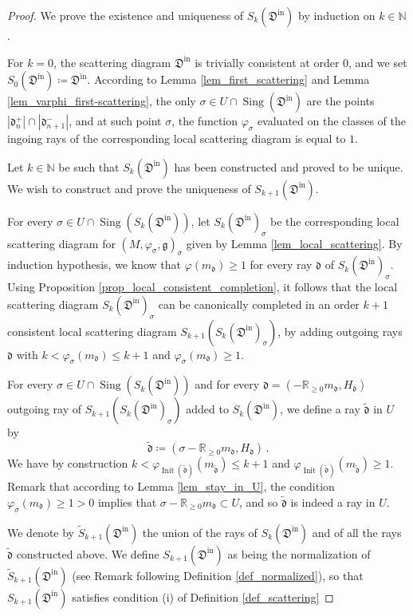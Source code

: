 \documentclass[12pt, a4paper]{amsart}
\newcommand\NN{\mathbb N}
\newcommand\R{\mathbb R}
\newcommand\fd{\mathfrak d}
\newcommand\fD{\mathfrak D}
\newcommand\fg{\mathfrak g}
\newcommand\Sing{\operatorname{Sing}}
\newcommand\Init{\operatorname{Init}}
\newcommand\iin{\mathrm{in}}
\begin{document}
\begin{proof}
We prove the existence and uniqueness of 
$S_k(\fD^\iin)$ by induction on 
$k \in \NN$.

For $k=0$, the scattering diagram $\fD^\iin$ is trivially consistent at order $0$, and we set $S_0(\fD^\iin) \coloneq \fD^\iin$.
According to
Lemma \ref{lem_first_scattering} and Lemma
\ref{lem_varphi_first-scattering},
the only $\sigma \in U \cap \Sing(\fD^\iin)$ are the points $|\fd_n^+| \cap |\fd_{n+1}^-|$, and at such point $\sigma$, the 
function 
$\varphi_\sigma$ evaluated on the classes of the ingoing rays of the corresponding local scattering diagram is equal to $1$.

Let $k \in \NN$ be such that 
$S_k(\fD^\iin)$ has been constructed and 
proved to be unique. We wish to construct
and prove the uniqueness of $S_{k+1}(\fD^\iin)$.

For every $\sigma \in U \cap \Sing(S_k(\fD^\iin))$, let $S_k(\fD^\iin)_\sigma$ be the corresponding local scattering diagram for
$(M,\varphi_\sigma,\fg)_\sigma$ given by Lemma \ref{lem_local_scattering}. By induction hypothesis, we know that $\varphi(m_\fd) \geqslant 1$ for every ray $\fd$ of $S_k(\fD^\iin)_\sigma$. Using Proposition \ref{prop_local_consistent_completion}, it follows that the local scattering diagram $S_k(\fD^\iin)_\sigma$
can be canonically completed in an 
order $k+1$ consistent local scattering diagram 
$S_{k+1}(S_k(\fD^\iin)_\sigma)$, by adding outgoing rays $\fd$ with $k<\varphi_\sigma(m_\fd) \leqslant k+1$ and $\varphi_\sigma(m_\fd) \geqslant 1$.

For every $\sigma \in U \cap \Sing(S_k(\fD^\iin))$ and for every 
$\fd=(-\R_{\geqslant 0}m_\fd, H_\fd)$ outgoing ray of $S_{k+1}(S_k(\fD^\iin)_\sigma)$ added to $S_k(\fD^\iin)$, we define a ray $\tilde{\fd}$ in $U$ by
\[ \tilde{\fd} \coloneq (\sigma-\R_{\geqslant 0} m_\fd, H_\fd)\,.\]
We have by construction 
$k < \varphi_{\Init(\tilde{\fd})}(m_{\tilde{\fd}}) 
\leqslant k+1$ and $\varphi_{\Init(\tilde{\fd})}(m_{\tilde{\fd}}) \geqslant 1$.
Remark that according to Lemma
\ref{lem_stay_in_U}, the condition $\varphi_\sigma(m_\fd) \geqslant 1 >0$ implies that 
$\sigma -\R_{\geqslant 0}m_\fd \subset U$, and so 
$\tilde{\fd}$ is indeed a ray in $U$.

We denote by $\tilde{S}_{k+1}(\fD^\iin)$ the union of the rays of 
$S_k(\fD^\iin)$ and of all the rays $\tilde{\fd}$ constructed above. 
We define $S_{k+1}(\fD^\iin)$ as being the normalization of 
$\tilde{S}_{k+1}(\fD^\iin)$
(see Remark following Definition 
\ref{def_normalized}), so that
$S_{k+1}(\fD^\iin)$ satisfies condition (i) of Definition \ref{def_scattering}


\end{proof}
\end{document}
